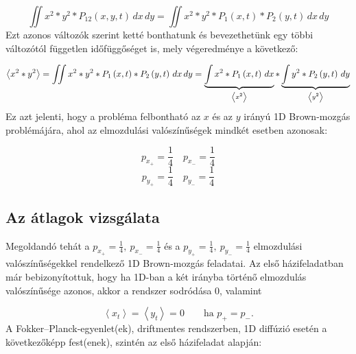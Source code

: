 \begin{equation} \label{eq:4}
    \iint{x^{2} * y^{2} * P_{12} \left( x, y, t \right)\, dx\, dy}
    =
    \iint{x^{2} * y^{2} * P_{1} \left( x, t \right) * P_{2} \left( y, t \right)\, dx\, dy}
\end{equation}
Ezt azonos változók szerint ketté bonthatunk és bevezethetünk egy többi változótól független időfüggőséget is, mely végeredménye a következő:

\begin{equation} \label{eq:5}
    \left< x^{2} * y^{2} \right>
    =
    \iint{x^{2} * y^{2} * P_{1} \left( x, t \right) * P_{2} \left( y, t \right)\, dx\, dy}
    =
    \underbrace{\int{x^{2} * P_{1} \left( x, t \right)\, dx}}_{\text{\normalfont $\left< x^{2} \right>$}} * \underbrace{\int{y^{2} * P_{2} \left( y, t \right)\, dy}}_{\text{\normalfont $\left< y^{2} \right>$}}
\end{equation}
Ez azt jelenti, hogy a probléma felbontható az $x$ és az $y$ irányú 1D Brown-mozgás problémájára, ahol az elmozdulási valószínűségek mindkét esetben azonosak:

\begin{equation*}
    p_{x_{+}} = \frac{1}{4} \quad p_{x_{-}} = \frac{1}{4}
\end{equation*}
\begin{equation*}
    p_{y_{+}} = \frac{1}{4} \quad p_{y_{-}} = \frac{1}{4}
\end{equation*}

\subsection{Az átlagok vizsgálata}
Megoldandó tehát a $p_{x_{+}} = \frac{1}{4},\ p_{x_{-}} = \frac{1}{4}$ és a $p_{y_{+}} = \frac{1}{4},\ p_{y_{-}} = \frac{1}{4}$ elmozdulási valószínűségekkel rendelkező 1D Brown-mozgás feladatai. Az első házifeladatban\cite{hazi1} már bebizonyítottuk, hogy ha 1D-ban a két irányba történő elmozdulás valószínűsége azonos, akkor a rendszer sodródása $0$, valamint

\begin{equation}
    \left< x_{t} \right> = \left< y_{t} \right> = 0 \quad \quad \text{ha $p_{+} = p_{-}$.}
\end{equation}
A Fokker--Planck-egyenlet(ek), driftmentes rendszerben, 1D diffúzió esetén a következőképp fest(enek), szintén az első házifeladat alapján\cite{hazi1}:

